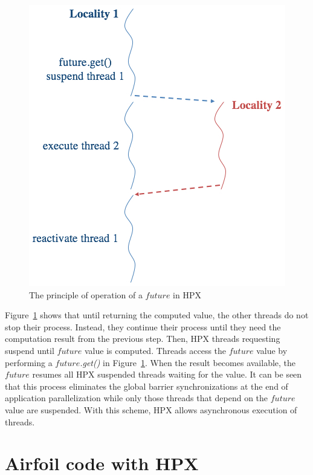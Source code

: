 \documentclass[conference]{IEEEtran}
\begin{document}
\begin{figure} [!h]
\begin{center}
\centering
\includegraphics[width=0.75\columnwidth]{Pictures/f4a.jpg}
\caption {The principle of operation of a \textit{$future$} in HPX}
\label{f4}
\end{center}
\end{figure}



Figure~\ref{f4} shows that until returning the computed value, the other threads do not stop their process. Instead, they continue their process until they need the computation result from the previous step. Then, HPX threads requesting suspend until $future$ value is computed. Threads access the $future$ value by performing a \textit{$future$.get()} in Figure~\ref{f4}. When the result becomes available, the \textit{$future$} resumes all HPX suspended threads waiting for the value. It can be seen that this process eliminates the global barrier synchronizations at the end of application parallelization while only those threads that depend on the $future$ value are suspended. With this scheme, HPX allows asynchronous execution of threads.


\section{Airfoil code with HPX}
\label{sec:air}
\end{document}
